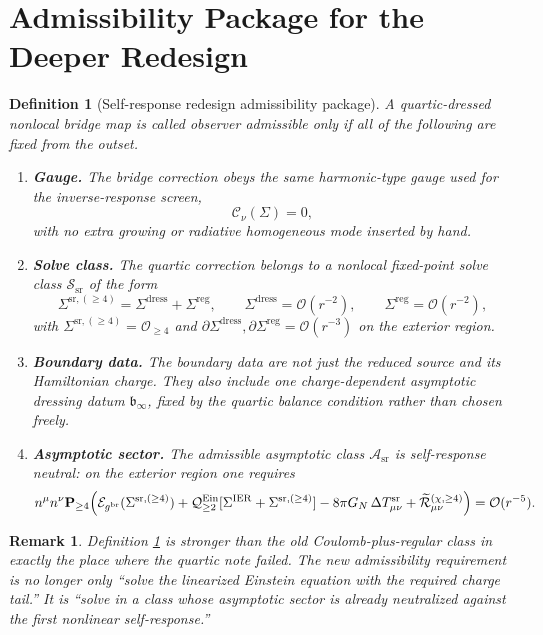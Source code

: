 \documentclass[11pt]{article}
\newcommand{\ReBridge}{g^{\mathrm{br}}}
\newcommand{\SigmaIER}{\Sigma^{\mathrm{IER}}}
\newcommand{\SigmaSRFour}{\Sigma^{\mathrm{sr},(\ge 4)}}
\newcommand{\SigmaDress}{\Sigma^{\mathrm{dress}}}
\newcommand{\SigmaReg}{\Sigma^{\mathrm{reg}}}
\newcommand{\ReLongFour}{\widetilde{\mathcal R}_{\mu\nu}^{(\chi,\ge 4)}}
\newcommand{\EinLin}{\mathcal E_{\ReBridge}}
\newcommand{\EinQuad}{\mathcal Q_{\ge 2}^{\mathrm{Ein}}}
\newcommand{\GaugeH}{\mathcal C}
\newcommand{\Pfour}{\mathbf P_{\ge 4}}
\newcommand{\AsymClass}{\mathscr A_{\mathrm{sr}}}
\newcommand{\SolveClass}{\mathscr S_{\mathrm{sr}}}
\newcommand{\DeltaTSR}{\Delta T_{\mu\nu}^{\mathrm{sr}}}
\newtheorem{definition}{Definition}
\newtheorem{remark}{Remark}
\begin{document}
\section{Admissibility Package for the Deeper Redesign}

\begin{definition}[Self-response redesign admissibility package]
\label{def:admissibility}
A quartic-dressed nonlocal bridge map is called \emph{observer admissible} only if all of the following are fixed from the outset.
\begin{enumerate}
    \item \textbf{Gauge.} The bridge correction obeys the same harmonic-type gauge used for the inverse-response screen,
    \begin{equation}
    \GaugeH_\nu(\Sigma)=0,
    \label{eq:gauge}
    \end{equation}
    with no extra growing or radiative homogeneous mode inserted by hand.
    \item \textbf{Solve class.} The quartic correction belongs to a nonlocal fixed-point solve class \(\SolveClass\) of the form
    \begin{equation}
    \SigmaSRFour
    =
    \SigmaDress+\SigmaReg,
    \qquad
    \SigmaDress=\mathcal O(r^{-2}),
    \qquad
    \SigmaReg=\mathcal O(r^{-2}),
    \label{eq:split}
    \end{equation}
    with \(\SigmaSRFour=\mathcal O_{\ge 4}\) and \(\partial \SigmaDress,\partial \SigmaReg=\mathcal O(r^{-3})\) on the exterior region.
    \item \textbf{Boundary data.} The boundary data are not just the reduced source and its Hamiltonian charge. They also include one charge-dependent asymptotic dressing datum \(\mathfrak b_\infty\), fixed by the quartic balance condition rather than chosen freely.
    \item \textbf{Asymptotic sector.} The admissible asymptotic class \(\AsymClass\) is \emph{self-response neutral}: on the exterior region one requires
    \begin{equation}
    n^\mu n^\nu \Pfour
    \Bigl(
    \EinLin(\SigmaSRFour)
    +\EinQuad[\SigmaIER+\SigmaSRFour]
    -8\pi G_N\,\DeltaTSR
    +\ReLongFour
    \Bigr)
    =
    \mathcal O(r^{-5}).
    \label{eq:neutral}
    \end{equation}
\end{enumerate}
\end{definition}

\begin{remark}
Definition \ref{def:admissibility} is stronger than the old Coulomb-plus-regular class in exactly the place where the quartic note failed. The new admissibility requirement is no longer only ``solve the linearized Einstein equation with the required charge tail.'' It is ``solve in a class whose asymptotic sector is already neutralized against the first nonlinear self-response.''
\end{remark}
\end{document}
